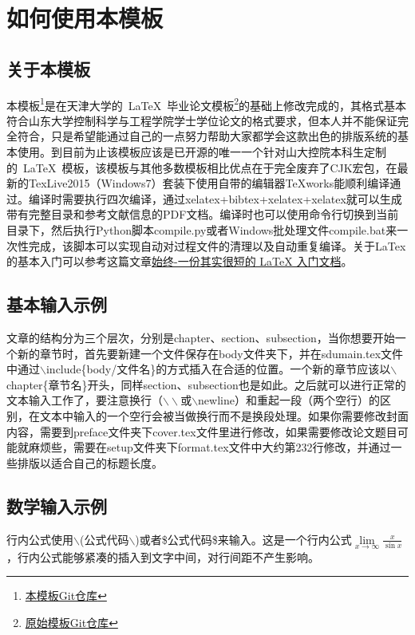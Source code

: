 \chapter{如何使用本模板}
\label{chap:howtouse}

\section{关于本模板}
本模板\footnote{\href{https://github.com/PlainSailing/SDUThesis}{本模板Git仓库}}是在天津大学的~\LaTeX{}~毕业论文模板\footnote{\href{https://github.com/xnth97/TJUThesisLatexTemplate}{原始模板Git仓库}}的基础上修改完成的，其格式基本符合山东大学控制科学与工程学院学士学位论文的格式要求，但本人并不能保证完全符合，只是希望能通过自己的一点努力帮助大家都学会这款出色的排版系统的基本使用。到目前为止该模板应该是已开源的唯一一个针对山大控院本科生定制的~\LaTeX{}~模板，该模板与其他多数模板相比优点在于完全废弃了CJK宏包，在最新的TexLive2015（Windows7）套装下使用自带的编辑器TeXworks能顺利编译通过。编译时需要执行四次编译，通过xelatex+bibtex+xelatex+xelatex就可以生成带有完整目录和参考文献信息的PDF文档。编译时也可以使用命令行切换到当前目录下，然后执行Python脚本compile.py或者Windows批处理文件compile.bat来一次性完成，该脚本可以实现自动对过程文件的清理以及自动重复编译。关于LaTex的基本入门可以参考这篇文章\textcolor[rgb]{1.00,0.00,0.00}{\href{http://liam0205.me/2014/09/08/latex-introduction/}{始终-一份其实很短的 LaTeX 入门文档}}。
\section{基本输入示例}
文章的结构分为三个层次，分别是chapter、section、subsection，当你想要开始一个新的章节时，首先要新建一个文件保存在body文件夹下，并在sdumain.tex文件中通过$\backslash$include\{body/文件名\}的方式插入在合适的位置。一个新的章节应该以$\backslash$chapter\{章节名\}开头，同样section、subsection也是如此。之后就可以进行正常的文本输入工作了，要注意换行（$\backslash\backslash$或$\backslash$newline）和重起一段（两个空行）的区别，在文本中输入的一个空行会被当做换行而不是换段处理。如果你需要修改封面内容，需要到preface文件夹下cover.tex文件里进行修改，如果需要修改论文题目可能就麻烦些，需要在setup文件夹下format.tex文件中大约第232行修改，并通过一些排版以适合自己的标题长度。
\section{数学输入示例}
行内公式使用$\backslash$(\textcolor[rgb]{0,0,1}{公式代码}$\backslash$)或者\$\textcolor[rgb]{0,0,1}{公式代码}\$来输入。这是一个行内公式$\mathop {\lim }\limits_{x \to \infty } \frac{x}{{\sin x}}$，行内公式能够紧凑的插入到文字中间，对行间距不产生影响。


